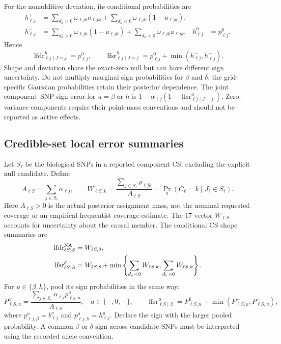 \documentclass[11pt]{article}
\begin{document}
For the nonadditive deviation, its conditional probabilities are
\begin{align}
 h^+_{\ell j}
 &=\sum_{d_k>0}\omega_{\ell jk}a_{\ell jk}
   +\sum_{d_k<0}\omega_{\ell jk}(1-a_{\ell jk}),\nonumber\\
 h^-_{\ell j}
 &=\sum_{d_k>0}\omega_{\ell jk}(1-a_{\ell jk})
   +\sum_{d_k<0}\omega_{\ell jk}a_{\ell jk},&
 h^0_{\ell j}&=p^0_{\ell j}.
 \label{eq:deviation-probs}
\end{align}
Hence
\begin{equation}
 \operatorname{lfdr}^{h}_{\ell j\mid J=j}=p^0_{\ell j},\qquad
 \operatorname{lfsr}^{h}_{\ell j\mid J=j}
    =p^0_{\ell j}+\min(h^-_{\ell j},h^+_{\ell j}).
 \label{eq:deviation-lfsr}
\end{equation}
Shape and deviation share the exact-zero null but can have different sign
uncertainty. Do not multiply marginal sign probabilities for $\beta$ and
$\delta$: the grid-specific Gaussian probabilities retain their posterior
dependence. The joint component--SNP sign error for $u=\beta$ or $h$ is
$1-\alpha_{\ell j}(1-\operatorname{lfsr}^{u}_{\ell j\mid J=j})$.
Zero-variance components require their point-mass conventions and should
not be reported as active effects.

\subsection{Credible-set local error summaries}
\label{sec:cs-errors}
Let $S_\ell$ be the biological SNPs in a reported component CS, excluding
the explicit null candidate. Define
\begin{equation}
 A_{\ell S}=\sum_{j\in S_\ell}\alpha_{\ell j},\qquad
 W_{\ell S,k}=\frac{\sum_{j\in S_\ell}\rho_{\ell jk}}{A_{\ell S}}
            =\Pr_q(C_\ell=k\mid J_\ell\in S_\ell).
 \label{eq:cs-shape-weights}
\end{equation}
Here $A_{\ell S}>0$ is the actual posterior assignment mass, not the nominal
requested coverage or an empirical frequentist coverage estimate.
The 17-vector $W_{\ell S}$ accounts for uncertainty about the causal member.
The conditional CS shape summaries are
\begin{align}
 \operatorname{lfdr}^{\rm NA}_{\ell S\mid S}
 &=W_{\ell S,8},\nonumber\\
 \operatorname{lfsr}^{\delta}_{\ell S\mid S}
 &=W_{\ell S,8}+
   \min\left\{\sum_{d_k<0}W_{\ell S,k},\sum_{d_k>0}W_{\ell S,k}\right\}.
 \label{eq:cs-conditional-errors}
\end{align}
For $u\in\{\beta,h\}$, pool its sign probabilities in the same way:
\begin{equation}
 P^a_{\ell S,u}
 =\frac{\sum_{j\in S_\ell}\alpha_{\ell j}p^a_{\ell j,u}}{A_{\ell S}},
 \quad a\in\{-,0,+\},\qquad
 \operatorname{lfsr}^{u}_{\ell S\mid S}
 =P^0_{\ell S,u}+\min(P^-_{\ell S,u},P^+_{\ell S,u}),
 \label{eq:cs-effect-lfsr}
\end{equation}
where $p^a_{\ell j,\beta}=b^a_{\ell j}$ and
$p^a_{\ell j,h}=h^a_{\ell j}$. Declare the sign with the larger pooled
probability. A common $\beta$ or $\delta$ sign across candidate SNPs must
be interpreted using the recorded allele convention.
\end{document}
